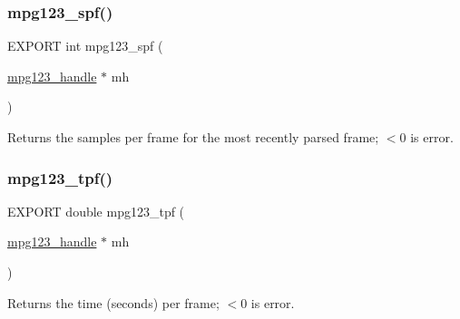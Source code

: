 \subsubsection{\texorpdfstring{mpg123\+\_\+spf()}{mpg123\_spf()}}
{\footnotesize\ttfamily E\+X\+P\+O\+RT int mpg123\+\_\+spf (\begin{DoxyParamCaption}\item[{\hyperlink{group__mpg123__init_ga6728e2839a395f3a07d4514da659faca}{mpg123\+\_\+handle} $\ast$}]{mh }\end{DoxyParamCaption})}

Returns the samples per frame for the most recently parsed frame; $<$0 is error. \mbox{\label{group__mpg123__status_ga90e18f73bbbee0898339616d0093059b}} 
\subsubsection{\texorpdfstring{mpg123\+\_\+tpf()}{mpg123\_tpf()}}
{\footnotesize\ttfamily E\+X\+P\+O\+RT double mpg123\+\_\+tpf (\begin{DoxyParamCaption}\item[{\hyperlink{group__mpg123__init_ga6728e2839a395f3a07d4514da659faca}{mpg123\+\_\+handle} $\ast$}]{mh }\end{DoxyParamCaption})}

Returns the time (seconds) per frame; $<$0 is error. 